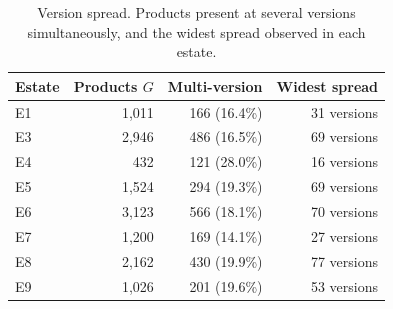 \begin{table}[htbp]
\centering
\caption{Version spread. Products present at several versions simultaneously, and the widest spread observed in each estate.}
\label{tab:version-spread}
\footnotesize
\begin{tabular}{l r r r}
\hline
Estate & Products $G$ & Multi-version & Widest spread \\
\hline
E1 & 1,011 & 166 (16.4\%) & 31 versions \\
E3 & 2,946 & 486 (16.5\%) & 69 versions \\
E4 & 432 & 121 (28.0\%) & 16 versions \\
E5 & 1,524 & 294 (19.3\%) & 69 versions \\
E6 & 3,123 & 566 (18.1\%) & 70 versions \\
E7 & 1,200 & 169 (14.1\%) & 27 versions \\
E8 & 2,162 & 430 (19.9\%) & 77 versions \\
E9 & 1,026 & 201 (19.6\%) & 53 versions \\
\hline
\end{tabular}
\end{table}
